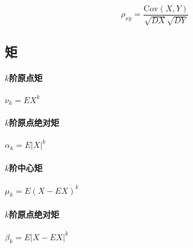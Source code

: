 \begin{equation*}
  \rho_{xy} = \dfrac{\mathrm{Cov}(X,Y)}{\sqrt{DX} \sqrt{DY}}
\end{equation*}

\subsection{矩}

\paragraph{$k$阶原点矩}
$\nu_{k}=EX^{k}$

\paragraph{$k$阶原点绝对矩}
$\alpha_{k}=E|X|^{k}$

\paragraph{$k$阶中心矩}
$\mu_{k}=E(X-EX)^{k}$

\paragraph{$k$阶原点绝对矩}
$\beta_{k}=E|X-EX|^{k}$

